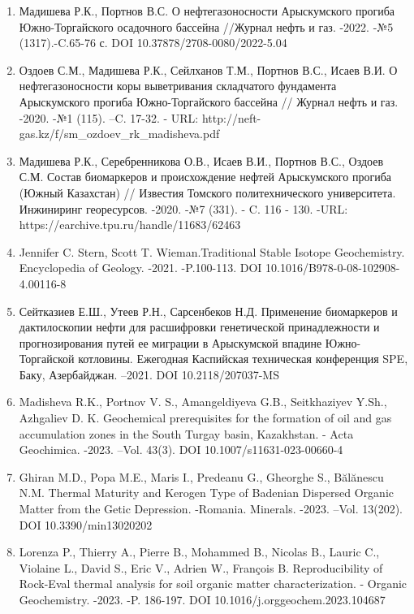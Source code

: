 \begin{enumerate}
\def\labelenumi{\arabic{enumi}.}
\item
  Мадишева Р.К., Портнов В.С. О нефтегазоносности Арыскумского прогиба
  Южно-Торгайского осадочного бассейна //Журнал нефть и газ. -2022. -№5
  (1317).-C.65-76 с. DOI 10.37878/2708-0080/2022-5.04
\item
  Оздоев С.М., Мадишева Р.К., Сейлханов Т.М., Портнов В.С., Исаев В.И. О
  нефтегазоносности коры выветривания складчатого фундамента
  Арыскумского прогиба Южно-Торгайского бассейна // Журнал нефть и газ.
  -2020. -№1 (115). --C. 17-32. - URL:
  http://neft-gas.kz/f/sm\_ozdoev\_rk\_madisheva.pdf
\item
  Мадишева Р.К., Серебренникова О.В., Исаев В.И., Портнов В.С., Оздоев
  С.М. Состав биомаркеров и происхождение нефтей Арыскумского прогиба
  (Южный Казахстан) // Известия Томского политехнического университета.
  Инжиниринг георесурсов. -2020. -№7 (331). - C. 116 - 130. -URL:
  https://earchive.tpu.ru/handle/11683/62463
\item
  Jennifer C. Stern, Scott T. Wieman.Traditional Stable Isotope
  Geochemistry. Encyclopedia of Geology. -2021. -P.100-113. DOI
  10.1016/B978-0-08-102908-4.00116-8
\item
  Сейтказиев Е.Ш., Утеев Р.Н., Сарсенбеков Н.Д. Применение биомаркеров и
  дактилоскопии нефти для расшифровки генетической принадлежности и
  прогнозирования путей ее миграции в Арыскумской впадине
  Южно-Торгайской котловины. Ежегодная Каспийская техническая
  конференция SPE, Баку, Азербайджан. --2021. DOI 10.2118/207037-MS
\item
  Madisheva R.K., Portnov V. S., Amangeldiyeva G.B., Seitkhaziyev Y.Sh.,
  Azhgaliev D. K. Geochemical prerequisites for the formation of oil and
  gas accumulation zones in the South Turgay basin, Kazakhstan. - Acta
  Geochimica. -2023. --Vol. 43(3). DOI 10.1007/s11631-023-00660-4
\item
  Ghiran M.D., Popa M.E., Maris I., Predeanu G., Gheorghe S., Bălănescu
  N.M. Thermal Maturity and Kerogen Type of Badenian Dispersed Organic
  Matter from the Getic Depression. -Romania. Minerals. -2023. --Vol.
  13(202). DOI 10.3390/min13020202
\item
  Lorenza P., Thierry A., Pierre B., Mohammed B., Nicolas B., Lauric C.,
  Violaine L., David S., Eric V., Adrien W., François B. Reproducibility
  of Rock-Eval thermal analysis for soil organic matter
  characterization. - Organic Geochemistry. -2023. -P. 186-197. DOI
  10.1016/j.orggeochem.2023.104687

\end{enumerate}
